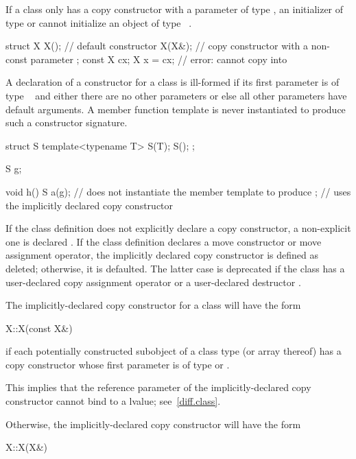 \pnum
\begin{note}
If a class
only has a copy constructor with a parameter of type
,
an initializer of type
or
cannot initialize an object of type
\cv{}~.
\begin{example}
\begin{codeblock}
struct X {
  X();              // default constructor
  X(X&);            // copy constructor with a non-const parameter
};
const X cx;
X x = cx;           // error:  cannot copy  into 
\end{codeblock}
\end{example}
\end{note}

\pnum
A declaration of a constructor for a class
is ill-formed if its first parameter is of type
\cv{}~
and either there are no other parameters or else all other parameters have
default arguments.
A member function template is never instantiated to
produce such a constructor signature.
\begin{example}
\begin{codeblock}
struct S {
  template<typename T> S(T);
  S();
};

S g;

void h() {
  S a(g);           // does not instantiate the member template to produce ;
                    // uses the implicitly declared copy constructor
}
\end{codeblock}
\end{example}

\pnum
If the class definition does not explicitly declare a copy constructor,
a non-explicit one is declared .
If the class definition declares a move
constructor or move assignment operator, the implicitly declared copy
constructor is defined as deleted; otherwise, it is
defaulted.
The latter case is deprecated if the class has a user-declared copy assignment
operator or a user-declared destructor .

\pnum
The implicitly-declared copy constructor for a class
will have the form
\begin{codeblock}
X::X(const X&)
\end{codeblock}
if each potentially constructed subobject of a class type
(or array thereof)
has a copy constructor whose first parameter is of type
or
.
\begin{footnote}
This implies that the reference parameter of the
implicitly-declared copy constructor
cannot bind to a
lvalue; see~\ref{diff.class}.
\end{footnote}
Otherwise, the implicitly-declared copy constructor will have the form
\begin{codeblock}
X::X(X&)
\end{codeblock}

